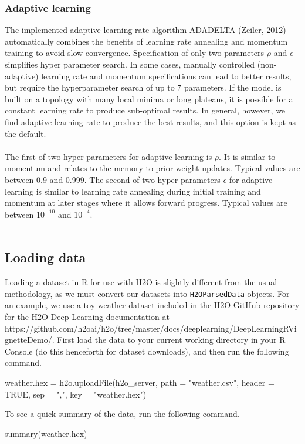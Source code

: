 \documentclass[11pt]{article}
\begin{document}
\subsubsection{Adaptive learning} \label{2.4.3}
The implemented adaptive learning rate algorithm ADADELTA (\href{http://arxiv.org/pdf/1212.5701v1.pdf}{Zeiler, 2012})  automatically combines the benefits of learning rate annealing and momentum training to avoid slow convergence. Specification of only two parameters $\rho$ and $\epsilon$  simplifies hyper parameter search. In some cases, manually controlled (non-adaptive) learning rate and momentum specifications can lead to better results, but require the hyperparameter search of up to 7 parameters. If the model is built on a topology with many local minima or long plateaus, it is possible for a constant learning rate to produce sub-optimal results. In general, however, we find adaptive learning rate to produce the best results, and this option is kept as the default. 
\\
\\
The first of two hyper parameters for adaptive learning is $\rho$. It is similar to momentum and relates to the memory to prior weight updates. Typical values are between 0.9 and 0.999. The second of two hyper parameters $\epsilon$ for adaptive learning is similar to learning rate annealing during initial training and momentum at later stages where it allows forward progress.
Typical values are between $10^{-10}$ and $10^{-4}$.
\\
\\
\subsection{Loading data} \label{2.5}

Loading a dataset in R for use with H2O is slightly different from the usual methodology, as we must convert our datasets into \texttt{H2OParsedData} objects. For an example, we use a toy weather dataset included in the \href{https://github.com/h2oai/h2o/tree/master/docs/deeplearning/DeepLearningRVignetteDemo}{H2O GitHub repository for the H2O Deep Learning documentation} at \\https://github.com/h2oai/h2o/tree/master/docs/deeplearning/DeepLearningRVignetteDemo/. First load the data to your current working directory in your R Console (do this henceforth for dataset downloads), and then run the following command.

\begin{spverbatim}
weather.hex = h2o.uploadFile(h2o_server, path = "weather.csv", header = TRUE, sep = ",", key = "weather.hex")
\end{spverbatim}
\bigskip
\noindent
To see a quick summary of the data, run the following command.
\begin{spverbatim}
summary(weather.hex)
\end{spverbatim}
\end{document}
